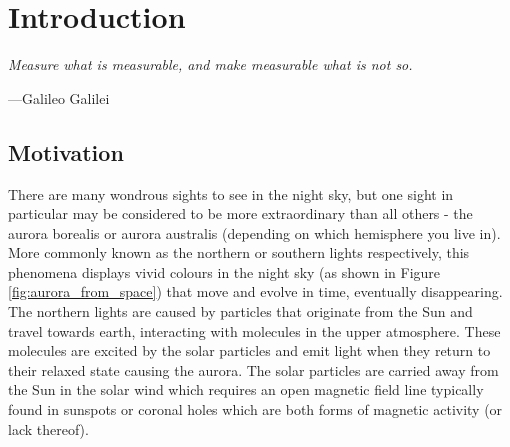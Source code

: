 
\chapter{Introduction} %

\label{Chapter1} %


\newcommand{\keyword}[1]{\textbf{#1}}
\newcommand{\tabhead}[1]{\textbf{#1}}
\newcommand{\code}[1]{\texttt{#1}}
\newcommand{\file}[1]{\texttt{\bfseries#1}}
\newcommand{\option}[1]{\texttt{\itshape#1}}

\newcommand{\ts}{\textsuperscript}
\newcommand{\caII}{Ca II H \& K\xspace}
\newcommand{\Rprime}{$R^{'}_{HK}$\xspace}
\newcommand{\Smw}{$S_{MW}$\xspace}

\newcommand{\esp}{\textit{ESPaDOnS}\xspace}
\newcommand{\narval}{\textit{NARVAL}\xspace}
\newcommand{\Halpha}{H-$\alpha$\xspace}

\newcommand{\Ro}{$R_{0}$\xspace}
\newcommand{\tauc}{$\tau_{c}$\xspace}


\epigraph{\itshape Measure what is measurable, and make measurable what is not so.}{---Galileo Galilei}

\section{Motivation}

There are many wondrous sights to see in the night sky, but one sight in particular may be considered to be more extraordinary than all others - the aurora borealis or aurora australis (depending on which hemisphere you live in). More commonly known as the northern or southern lights respectively, this phenomena displays vivid colours in the night sky (as shown in Figure \ref{fig:aurora_from_space}) that move and evolve in time, eventually disappearing. The northern lights are caused by particles that originate from the Sun and travel towards earth, interacting with molecules in the upper atmosphere. These molecules are excited by the solar particles and emit light when they return to their relaxed state causing the aurora. The solar particles are carried away from the Sun in the solar wind \citep{Parker_1958} which requires an open magnetic field line typically found in sunspots or coronal holes which are both forms of magnetic activity (or lack thereof).

